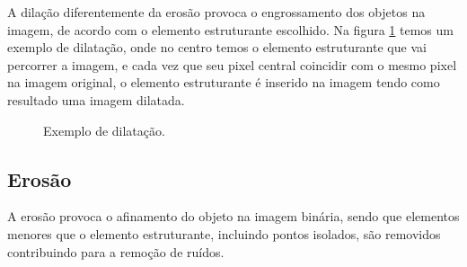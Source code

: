 A dilação diferentemente da erosão provoca o engrossamento dos objetos na imagem, de acordo com o elemento estruturante escolhido. Na figura \ref{subfig:dilatacao} temos um exemplo de dilatação, onde no centro temos o elemento estruturante que vai percorrer a imagem, e cada vez que seu pixel central coincidir com o mesmo pixel na imagem original, o elemento estruturante é inserido na imagem tendo como resultado uma imagem dilatada.

\begin{figure}[h]
 \centering
   \qquad
   \qquad
   \caption{ Exemplo de dilatação. \cite{pdi99}}
  \label{subfig:dilatacao}
\end{figure}

\subsection{Erosão}
\label{subsec:morfologia-erosao}

A erosão provoca o afinamento do objeto na imagem binária, sendo que elementos menores que o elemento estruturante, incluindo pontos isolados, são removidos contribuindo para a remoção de ruídos. \cite{digitalImgProcess2010}

